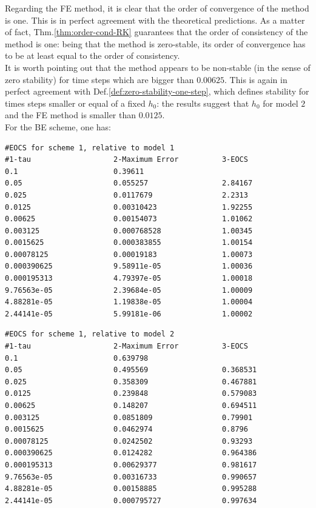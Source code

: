 \documentclass[11pt]{article}
\theoremstyle{theorem}
\theoremstyle{definition}
\begin{document}
Regarding the FE method, it is clear that the order of convergence of the method is one. This is in perfect agreement with the theoretical predictions. As a matter of fact, Thm.\ref{thm:order-cond-RK} guarantees that the order of consistency of the method is one: being that the method is zero-stable, its order of convergence has to be at least equal to the order of consistency.\\
It is worth pointing out that the method appears to be non-stable (in the sense of zero stability) for time steps which are bigger than $0.00625$. This is again in perfect agreement with Def.\ref{def:zero-stability-one-step}, which defines stability for times steps smaller or equal of a fixed $h_0$: the results suggest that $h_0$ for model $2$ and the FE method is smaller than $0.0125$.\\

For the BE scheme, one has:

\begin{lstlisting}
#EOCS for scheme 1, relative to model 1
#1-tau                   2-Maximum Error          3-EOCS                   
0.1                      0.39611                  	
0.05                     0.055257                 2.84167
0.025                    0.0117679                2.2313
0.0125                   0.00310423               1.92255
0.00625                  0.00154073               1.01062
0.003125                 0.000768528              1.00345
0.0015625                0.000383855              1.00154
0.00078125               0.00019183               1.00073
0.000390625              9.58911e-05              1.00036
0.000195313              4.79397e-05              1.00018
9.76563e-05              2.39684e-05              1.00009
4.88281e-05              1.19838e-05              1.00004
2.44141e-05              5.99181e-06              1.00002
\end{lstlisting}

\begin{lstlisting}
#EOCS for scheme 1, relative to model 2
#1-tau                   2-Maximum Error          3-EOCS                   
0.1                      0.639798                 	
0.05                     0.495569                 0.368531
0.025                    0.358309                 0.467881
0.0125                   0.239848                 0.579083
0.00625                  0.148207                 0.694511
0.003125                 0.0851809                0.79901
0.0015625                0.0462974                0.8796
0.00078125               0.0242502                0.93293
0.000390625              0.0124282                0.964386
0.000195313              0.00629377               0.981617
9.76563e-05              0.00316733               0.990657
4.88281e-05              0.00158885               0.995288
2.44141e-05              0.000795727              0.997634
\end{lstlisting}
\end{document}
